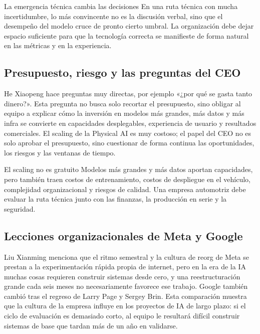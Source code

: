 \begin{importantbox}{La emergencia técnica cambia las decisiones}
En una ruta técnica con mucha incertidumbre, lo más convincente no es la discusión verbal, sino que el desempeño del modelo cruce de pronto cierto umbral. La organización debe dejar espacio suficiente para que la tecnología correcta se manifieste de forma natural en las métricas y en la experiencia.
\end{importantbox}

\subsection{Presupuesto, riesgo y las preguntas del CEO}

He Xiaopeng hace preguntas muy directas, por ejemplo «¿por qué se gasta tanto dinero?». Esta pregunta no busca solo recortar el presupuesto, sino obligar al equipo a explicar cómo la inversión en modelos más grandes, más datos y más infra se convierte en capacidades desplegables, experiencia de usuario y resultados comerciales. El scaling de la Physical AI es muy costoso; el papel del CEO no es solo aprobar el presupuesto, sino cuestionar de forma continua las oportunidades, los riesgos y las ventanas de tiempo.

\begin{warningbox}{El scaling no es gratuito}
Modelos más grandes y más datos aportan capacidades, pero también traen costos de entrenamiento, costos de despliegue en el vehículo, complejidad organizacional y riesgos de calidad. Una empresa automotriz debe evaluar la ruta técnica junto con las finanzas, la producción en serie y la seguridad.
\end{warningbox}

\subsection{Lecciones organizacionales de Meta y Google}

Liu Xianming menciona que el ritmo semestral y la cultura de reorg de Meta se prestan a la experimentación rápida propia de internet, pero en la era de la IA muchas cosas requieren construir sistemas desde cero, y una reestructuración grande cada seis meses no necesariamente favorece ese trabajo. Google también cambió tras el regreso de Larry Page y Sergey Brin. Esta comparación muestra que la cultura de la empresa influye en los proyectos de IA de largo plazo: si el ciclo de evaluación es demasiado corto, al equipo le resultará difícil construir sistemas de base que tardan más de un año en validarse.

